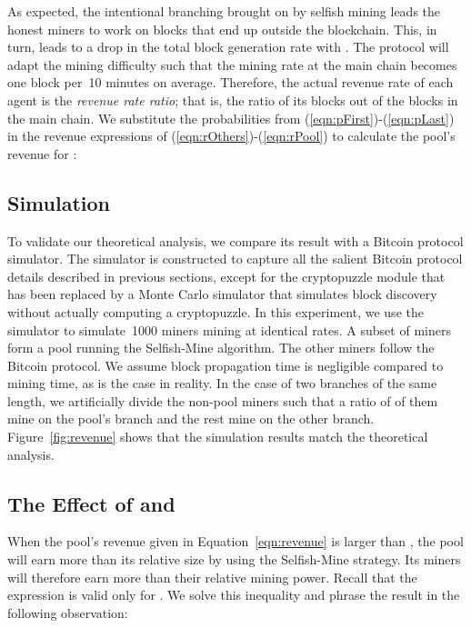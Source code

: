 \documentclass[letterpaper]{llncs}
\begin{document}
\newcommand{\RPool}{\ensuremath{ R_{\text{pool}} }}

As expected, the intentional branching brought on by selfish mining leads the honest miners to work on blocks that end up outside the blockchain. This, in turn, leads to a drop in the total block generation rate with . The protocol will adapt the mining difficulty such that the mining rate at the main chain becomes one block per~10 minutes on average. Therefore, the actual revenue rate of each agent is the \emph{revenue rate ratio}; that is, the ratio of its blocks out of the blocks in the main chain. We substitute the probabilities from (\ref{eqn:pFirst})-(\ref{eqn:pLast}) in the revenue expressions of (\ref{eqn:rOthers})-(\ref{eqn:rPool}) to calculate the pool's revenue for : 
 

        \subsection{Simulation} 
        
To validate our theoretical analysis, we compare its result with a Bitcoin protocol simulator. The simulator is constructed to capture all the salient Bitcoin protocol details described in previous sections, except for the cryptopuzzle module that has been replaced by a Monte Carlo simulator that simulates block discovery without actually computing a cryptopuzzle. In this experiment, we use the simulator to simulate~1000 miners mining at identical rates. A subset of  miners form a pool running the Selfish-Mine algorithm. The other miners follow the Bitcoin protocol. We assume block propagation time is negligible compared to mining time, as is the case in reality. In the case of two branches of the same length, we artificially divide the non-pool miners such that a ratio of  of them mine on the pool's branch and the rest mine on the other branch. Figure~\ref{fig:revenue} shows that the simulation results match the theoretical analysis. 

        \subsection{The Effect of  and } 

When the pool's revenue given in Equation~\ref{eqn:revenue} is larger than , the pool will earn more than its relative size by using the Selfish-Mine strategy. Its miners will therefore earn more than their relative mining power. Recall that the expression is valid only for . We solve this inequality and phrase the result in the following observation: 
\end{document}
